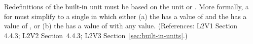 Redefinitions of the built-in unit  must be based on the unit
 or .  More formally, a \UnitDefinition
for  must simplify to a single \Unit in which either (a) the
  has a value of  and the
  has a value of , or (b) the
  has a value of  with
any  value.  (References: L2V1 Section 4.4.3; L2V2
Section~4.4.3; L2V3 Section~\ref{sec:built-in-units}.)
